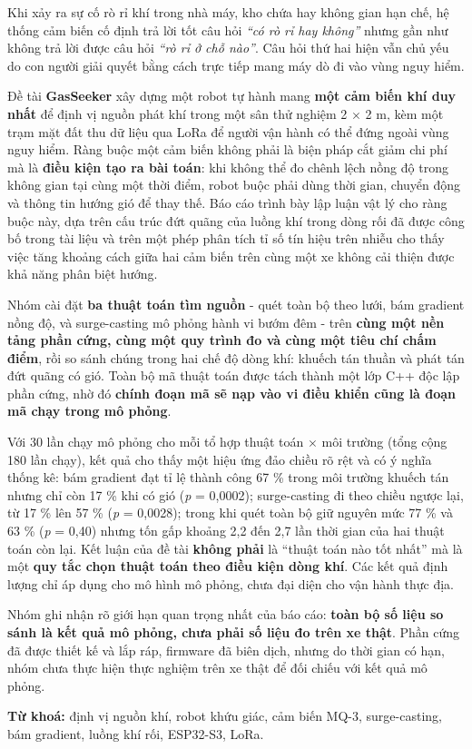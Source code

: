 Khi xảy ra sự cố rò rỉ khí trong nhà máy, kho chứa hay không gian hạn chế, hệ thống cảm biến cố định trả lời tốt câu hỏi \textit{``có rò rỉ hay không''} nhưng gần như không trả lời được câu hỏi \textit{``rò rỉ ở chỗ nào''}. Câu hỏi thứ hai hiện vẫn chủ yếu do con người giải quyết bằng cách trực tiếp mang máy dò đi vào vùng nguy hiểm.

Đề tài \textbf{GasSeeker} xây dựng một robot tự hành mang \textbf{một cảm biến khí duy nhất} để định vị nguồn phát khí trong một sân thử nghiệm 2 $\times$ 2 m, kèm một trạm mặt đất thu dữ liệu qua LoRa để người vận hành có thể đứng ngoài vùng nguy hiểm. Ràng buộc một cảm biến không phải là biện pháp cắt giảm chi phí mà là \textbf{điều kiện tạo ra bài toán}: khi không thể đo chênh lệch nồng độ trong không gian tại cùng một thời điểm, robot buộc phải dùng thời gian, chuyển động và thông tin hướng gió để thay thế. Báo cáo trình bày lập luận vật lý cho ràng buộc này, dựa trên cấu trúc đứt quãng của luồng khí trong dòng rối đã được công bố trong tài liệu và trên một phép phân tích tỉ số tín hiệu trên nhiễu cho thấy việc tăng khoảng cách giữa hai cảm biến trên cùng một xe không cải thiện được khả năng phân biệt hướng.

Nhóm cài đặt \textbf{ba thuật toán tìm nguồn} - quét toàn bộ theo lưới, bám gradient nồng độ, và surge-casting mô phỏng hành vi bướm đêm - trên \textbf{cùng một nền tảng phần cứng, cùng một quy trình đo và cùng một tiêu chí chấm điểm}, rồi so sánh chúng trong hai chế độ dòng khí: khuếch tán thuần và phát tán đứt quãng có gió. Toàn bộ mã thuật toán được tách thành một lớp C++ độc lập phần cứng, nhờ đó \textbf{chính đoạn mã sẽ nạp vào vi điều khiển cũng là đoạn mã chạy trong mô phỏng}.

Với 30 lần chạy mô phỏng cho mỗi tổ hợp thuật toán $\times$ môi trường (tổng cộng 180 lần chạy), kết quả cho thấy một hiệu ứng đảo chiều rõ rệt và có ý nghĩa thống kê: bám gradient đạt tỉ lệ thành công 67 \% trong môi trường khuếch tán nhưng chỉ còn 17 \% khi có gió (\textit{p} = 0,0002); surge-casting đi theo chiều ngược lại, từ 17 \% lên 57 \% (\textit{p} = 0,0028); trong khi quét toàn bộ giữ nguyên mức 77 \% và 63 \% (\textit{p} = 0,40) nhưng tốn gấp khoảng 2,2 đến 2,7 lần thời gian của hai thuật toán còn lại. Kết luận của đề tài \textbf{không phải} là ``thuật toán nào tốt nhất'' mà là một \textbf{quy tắc chọn thuật toán theo điều kiện dòng khí}. Các kết quả định lượng chỉ áp dụng cho mô hình mô phỏng, chưa đại diện cho vận hành thực địa.

Nhóm ghi nhận rõ giới hạn quan trọng nhất của báo cáo: \textbf{toàn bộ số liệu so sánh là kết quả mô phỏng, chưa phải số liệu đo trên xe thật}. Phần cứng đã được thiết kế và lắp ráp, firmware đã biên dịch, nhưng do thời gian có hạn, nhóm chưa thực hiện thực nghiệm trên xe thật để đối chiếu với kết quả mô phỏng.

\noindent \textbf{Từ khoá:} định vị nguồn khí, robot khứu giác, cảm biến MQ-3, surge-casting, bám gradient, luồng khí rối, ESP32-S3, LoRa.
